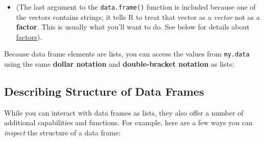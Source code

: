 \documentclass[]{book}
\newenvironment{Shaded}{\begin{snugshade}}{\end{snugshade}}
\newcommand{\KeywordTok}[1]{\textcolor[rgb]{0.13,0.29,0.53}{\textbf{#1}}}
\newcommand{\StringTok}[1]{\textcolor[rgb]{0.31,0.60,0.02}{#1}}
\newcommand{\CommentTok}[1]{\textcolor[rgb]{0.56,0.35,0.01}{\textit{#1}}}
\newcommand{\OperatorTok}[1]{\textcolor[rgb]{0.81,0.36,0.00}{\textbf{#1}}}
\newcommand{\NormalTok}[1]{#1}
\providecommand{\tightlist}{%
  \setlength{\itemsep}{0pt}\setlength{\parskip}{0pt}}
\theoremstyle{definition}
\theoremstyle{definition}
\theoremstyle{remark}
\begin{document}
\begin{itemize}
\tightlist
\item
  (The last argument to the \texttt{data.frame()} function is included
  because one of the vectors contains strings; it tells R to treat that
  vector as a \emph{vector} not as a \textbf{factor}. This is usually
  what you'll want to do. See below for details about
  \protect\hyperlink{factors}{factors}).
\end{itemize}

Because data frame elements are lists, you can access the values from
\texttt{my.data} using the same \textbf{dollar notation} and
\textbf{double-bracket notation} as lists:

\begin{Shaded}
\end{Shaded}

\subsection{Describing Structure of Data
Frames}\label{describing-structure-of-data-frames}

While you can interact with data frames as lists, they also offer a
number of additional capabilities and functions. For example, here are a
few ways you can \emph{inspect} the structure of a data frame:
\end{document}

